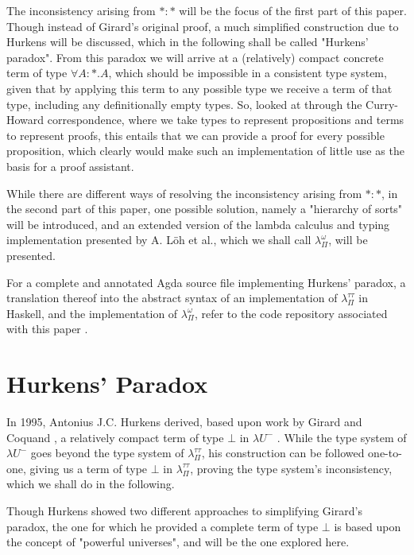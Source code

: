 \documentclass[runningheads]{llncs}
\begin{document}
The inconsistency arising from $\ast : \ast$ will be the focus of the first part
of this paper. Though instead of Girard's original proof, a much simplified
construction due to Hurkens \cite{hurkens1995simplification} will be discussed,
which in the following shall be called "Hurkens' paradox". From this paradox we
will arrive at a (relatively) compact concrete term of type $\forall A: \ast. A$,
which should be impossible in a consistent type system, given that by applying
this term to any possible type we receive a term of that type, including any
definitionally empty types. So, looked at through the Curry-Howard
correspondence, where we take types to represent propositions and terms to
represent proofs, this entails that we can provide a proof for every possible
proposition, which clearly would make such an implementation of little use as
the basis for a proof assistant.

While there are different ways of resolving the inconsistency arising from $\ast
: \ast$, in the second part of this paper, one possible solution, namely a
"hierarchy of sorts" will be introduced, and an extended version of the lambda
calculus and typing implementation presented by A. Löh et al., which we shall
call $\lambda_{\Pi}^{\omega}$, will be presented.

For a complete and annotated Agda source file implementing Hurkens' paradox, a
translation thereof into the abstract syntax of an implementation of
$\lambda_{\Pi}^{\tau \tau}$ in Haskell, and the implementation of
$\lambda_{\Pi}^{\omega}$, refer to the code repository associated with this
paper \cite{GitHubGa38:online}.

\section{Hurkens' Paradox}

In 1995, Antonius J.C. Hurkens derived, based upon work by Girard
\cite{girard1972interpretation} and Coquand \cite{coquand1986analysis}, a
relatively compact term of type $\bot$ in $\lambda U^-$
\cite{hurkens1995simplification}. While the type system of $\lambda U^-$ goes
beyond the type system of $\lambda_{\Pi}^{\tau \tau}$, his construction can be
followed one-to-one, giving us a term of type $\bot$ in $\lambda_{\Pi}^{\tau
\tau}$, proving the type system's inconsistency, which we shall do in the
following.

Though Hurkens showed two different approaches to simplifying Girard's paradox,
the one for which he provided a complete term of type $\bot$ is based upon the
concept of "powerful universes", and will be the one explored here.
\end{document}
